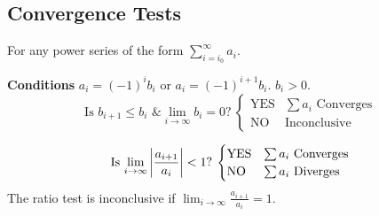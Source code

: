 \documentclass{article}
\begin{document}
\subsection{Convergence Tests}
For any power series of the form \(\displaystyle\sum_{i=i_0}^\infty a_i\).
\begin{tcolorboxlarge}[title={Alternating Series}]
    \textbf{Conditions} \(a_i = \left( -1 \right)^i b_i\) or
    \(a_i = \left( -1 \right)^{i+1} b_i\). \(b_i>0\).
    \begin{equation*}
        \text{Is \(b_{i+1}\leqslant b_i\) \& \(\lim_{i\to\infty}b_i=0\)?}\:
        \begin{cases}
            \text{YES} & \text{\(\sum a_i\) Converges} \\
            \text{NO}  & \text{Inconclusive}
        \end{cases}
    \end{equation*}
\end{tcolorboxlarge}
\begin{tcolorboxlarge}[title={Ratio Test}]
    \begin{equation*}
        \text{Is \(\lim_{i\to\infty}\abs{\frac{a_{i+1}}{a_i}} < 1\)?}\:
        \begin{cases}
            \text{YES} & \text{\(\sum a_i\) Converges} \\
            \text{NO}  & \text{\(\sum a_i\) Diverges}
        \end{cases}
    \end{equation*}
    The ratio test is inconclusive if
    \(\displaystyle \lim_{i\to\infty}\frac{a_{i+1}}{a_i} = 1\).
\end{tcolorboxlarge}
\end{document}
